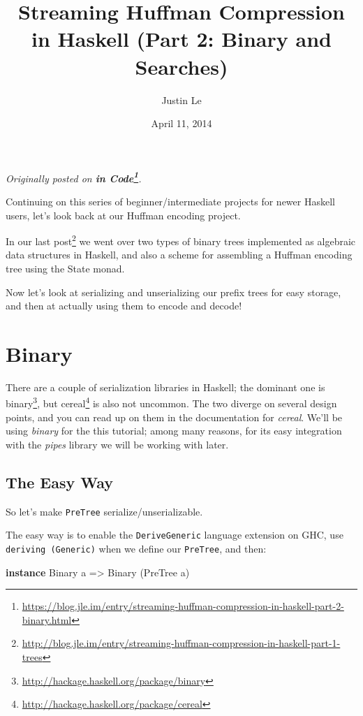 \documentclass[]{article}
\title{Streaming Huffman Compression in Haskell (Part 2: Binary and Searches)}
\author{Justin Le}
\date{April 11, 2014}
\newenvironment{Shaded}{}{}
\newcommand{\DataTypeTok}[1]{\textcolor[rgb]{0.56,0.13,0.00}{#1}}
\newcommand{\KeywordTok}[1]{\textcolor[rgb]{0.00,0.44,0.13}{\textbf{#1}}}
\newcommand{\NormalTok}[1]{#1}
\newcommand{\OtherTok}[1]{\textcolor[rgb]{0.00,0.44,0.13}{#1}}
\renewcommand{\href}[2]{#2\footnote{\url{#1}}}
\begin{document}
\maketitle

\emph{Originally posted on
\textbf{\href{https://blog.jle.im/entry/streaming-huffman-compression-in-haskell-part-2-binary.html}{in
Code}}.}

Continuing on this series of beginner/intermediate projects for newer Haskell
users, let's look back at our Huffman encoding project.

In our
\href{http://blog.jle.im/entry/streaming-huffman-compression-in-haskell-part-1-trees}{last
post} we went over two types of binary trees implemented as algebraic data
structures in Haskell, and also a scheme for assembling a Huffman encoding tree
using the State monad.

Now let's look at serializing and unserializing our prefix trees for easy
storage, and then at actually using them to encode and decode!

\hypertarget{binary}{%
\section{Binary}\label{binary}}

There are a couple of serialization libraries in Haskell; the dominant one is
\href{http://hackage.haskell.org/package/binary}{binary}, but
\href{http://hackage.haskell.org/package/cereal}{cereal} is also not uncommon.
The two diverge on several design points, and you can read up on them in the
documentation for \emph{cereal}. We'll be using \emph{binary} for the this
tutorial; among many reasons, for its easy integration with the \emph{pipes}
library we will be working with later.

\hypertarget{the-easy-way}{%
\subsection{The Easy Way}\label{the-easy-way}}

So let's make \texttt{PreTree} serialize/unserializable.

The easy way is to enable the \texttt{DeriveGeneric} language extension on GHC,
use \texttt{deriving\ (Generic)} when we define our \texttt{PreTree}, and then:

\begin{Shaded}
\begin{Highlighting}[]
\KeywordTok{instance} \DataTypeTok{Binary}\NormalTok{ a }\OtherTok{=>} \DataTypeTok{Binary}\NormalTok{ (}\DataTypeTok{PreTree}\NormalTok{ a)}
\end{Highlighting}
\end{Shaded}
\end{document}
